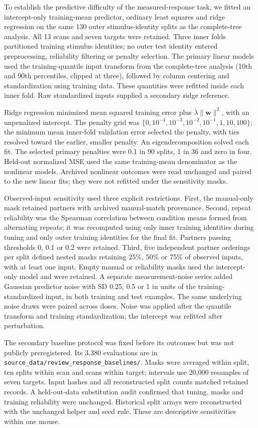 To establish the predictive difficulty of the measured-response task, we fitted
an intercept-only training-mean predictor, ordinary least squares and ridge
regression on the same 130 outer stimulus-identity splits as the complete-tree
analysis. All 13 scans and seven targets were retained. Three inner folds
partitioned training stimulus identities; no outer test identity entered
preprocessing, reliability filtering or penalty selection. The primary linear models used the training-quantile input transform from
the complete-tree analysis
(10th and 90th percentiles, clipped at three), followed by column centering and
standardization using training data. These quantities were refitted inside
each inner fold. Raw standardized inputs supplied a secondary ridge reference.

Ridge regression minimized mean squared training error plus
$\lambda\|\bm w\|^2$, with an unpenalized intercept. The penalty grid was
$\{0,10^{-4},10^{-3},10^{-2},10^{-1},1,10,100\}$; the minimum mean
inner-fold validation error selected the penalty, with ties resolved toward
the earlier, smaller penalty. An eigendecomposition solved each fit. The
selected primary penalties were 0.1 in 90 splits, 1 in 36 and zero in four.
Held-out normalized MSE used the same training-mean denominator as the
nonlinear models. Archived nonlinear outcomes were read unchanged and paired
to the new linear fits; they were not refitted under the sensitivity masks.

Observed-input sensitivity used three explicit restrictions. First, the
manual-only mask retained partners with archived manual-match provenance.
Second, repeat reliability was the Spearman correlation between condition
means formed from alternating repeats; it was recomputed using only inner
training identities during tuning and only outer training identities for
the final fit. Partners passing thresholds 0, 0.1 or 0.2 were retained.
Third, five independent partner orderings per split defined nested masks
retaining 25\%, 50\% or 75\% of observed inputs, with at least one input.
Empty manual or reliability masks used the intercept-only model and were
retained. A separate measurement-noise series added Gaussian predictor noise
with SD 0.25, 0.5 or 1 in units of the training-standardized input, in both
training and test examples. The same underlying noise draws were paired
across doses. Noise was applied after the quantile transform and training
standardization; the intercept was refitted after perturbation.

The secondary baseline protocol was fixed before its outcomes but was not publicly preregistered. Its 3,380 evaluations are in \texttt{source\_data/review\_response\_baselines/}. Masks were averaged within split, ten splits within scan and scans within target; intervals use 20,000 resamples of seven targets. Input hashes and all reconstructed split counts matched retained records. A held-out-data substitution audit confirmed that tuning, masks and training reliability were unchanged. Historical split arrays were reconstructed with the unchanged helper and seed rule. These are descriptive sensitivities within one mouse.

